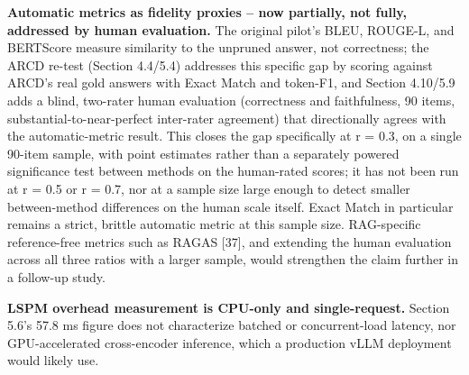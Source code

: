 \textbf{Automatic metrics as fidelity proxies -- now partially, not fully, addressed by human evaluation.} The original pilot's BLEU, ROUGE-L, and BERTScore measure similarity to the unpruned answer, not correctness; the ARCD re-test (Section 4.4/5.4) addresses this specific gap by scoring against ARCD's real gold answers with Exact Match and token-F1, and Section 4.10/5.9 adds a blind, two-rater human evaluation (correctness and faithfulness, 90 items, substantial-to-near-perfect inter-rater agreement) that directionally agrees with the automatic-metric result. This closes the gap specifically at r = 0.3, on a single 90-item sample, with point estimates rather than a separately powered significance test between methods on the human-rated scores; it has not been run at r = 0.5 or r = 0.7, nor at a sample size large enough to detect smaller between-method differences on the human scale itself. Exact Match in particular remains a strict, brittle automatic metric at this sample size. RAG-specific reference-free metrics such as RAGAS [37], and extending the human evaluation across all three ratios with a larger sample, would strengthen the claim further in a follow-up study.

\textbf{LSPM overhead measurement is CPU-only and single-request.} Section 5.6's 57.8 ms figure does not characterize batched or concurrent-load latency, nor GPU-accelerated cross-encoder inference, which a production vLLM deployment would likely use.


